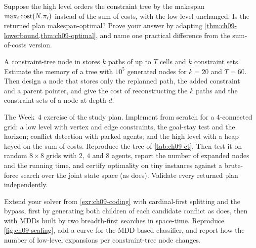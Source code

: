 \begin{exercise}[\difficulty{2}]
\label{exr:ch09-makespan}
Suppose the high level orders the constraint tree by the makespan
$\max_i \operatorname{cost}(N.\pi_i)$ instead of the sum of costs, with the low level
unchanged. Is the returned plan makespan-optimal? Prove your answer by
adapting \cref{thm:ch09-lowerbound,thm:ch09-optimal}, and name one
practical difference from the sum-of-costs version.
\end{exercise}

\begin{exercise}[\difficulty{2}]
\label{exr:ch09-memory}
A constraint-tree node in  stores $k$ paths of up to $T$
cells and $k$ constraint sets. Estimate the memory of a tree with $10^5$
generated nodes for $k = 20$ and $T = 60$. Then design a node that stores
only the replanned path, the added constraint and a parent pointer, and
give the cost of reconstructing the $k$ paths and the constraint sets of a
node at depth $d$.
\end{exercise}

\begin{exercise}
\label{exr:ch09-coding}
The Week~4 exercise of the study plan. Implement \cbs from scratch for a
4-connected grid: a low level with vertex and edge constraints, the
goal-stay test and the horizon; conflict detection with parked
agents; and the high level with a heap keyed on the sum of costs. Reproduce
the tree of \cref{tab:ch09-ct}. Then test it on random $8 \times 8$ grids
with $2$, $4$ and $8$ agents, report the number of expanded nodes and the
running time, and certify optimality on tiny instances against a
brute-force search over the joint state space (as 
does). Validate every returned plan independently.
\end{exercise}

\begin{exercise}
\label{exr:ch09-icbs-coding}
Extend your solver from \cref{exr:ch09-coding} with cardinal-first
splitting and the bypass, first by generating both children of each
candidate conflict as  does, then with MDDs built by two
breadth-first searches in space-time. Reproduce \cref{fig:ch09-scaling},
add a curve for the MDD-based classifier, and report how the number of
low-level expansions per constraint-tree node changes.
\end{exercise}
